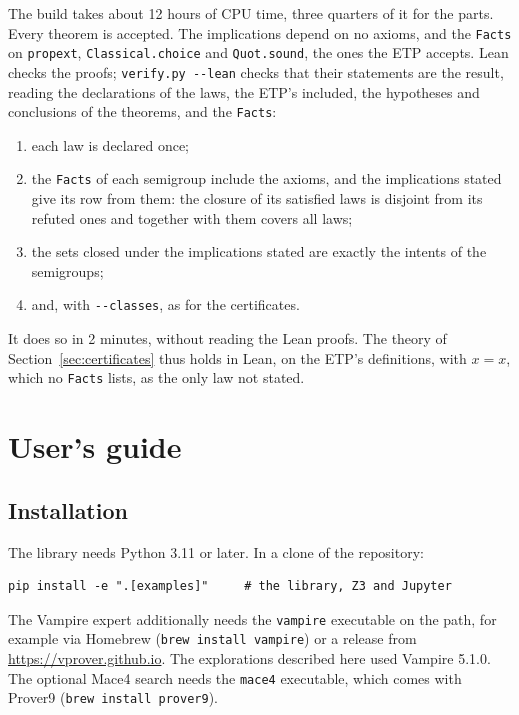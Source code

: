 \documentclass[11pt,a4paper]{article}
\theoremstyle{definition}
\theoremstyle{remark}
\newcommand{\code}[1]{\texttt{#1}}
\begin{document}
The build takes about 12 hours of CPU time, three quarters of it for the parts. Every theorem is accepted. The implications depend on no axioms, and the \code{Facts} on \code{propext}, \code{Classical.choice} and \code{Quot.sound}, the ones the ETP accepts. Lean checks the proofs; \code{verify.py -{}-lean} checks that their statements are the result, reading the declarations of the laws, the ETP's included, the hypotheses and conclusions of the theorems, and the \code{Facts}:
\begin{enumerate}
  \item each law is declared once;
  \item the \code{Facts} of each semigroup include the axioms, and the implications stated give its row from them: the closure of its satisfied laws is disjoint from its refuted ones and together with them covers all laws;
  \item the sets closed under the implications stated are exactly the intents of the semigroups;
  \item and, with \code{-{}-classes}, as for the certificates.
\end{enumerate}
It does so in 2 minutes, without reading the Lean proofs. The theory of Section~\ref{sec:certificates} thus holds in Lean, on the ETP's definitions, with $x = x$, which no \code{Facts} lists, as the only law not stated.

\section{User's guide}\label{sec:guide}

\subsection{Installation}

The library needs Python 3.11 or later. In a clone of the repository:
\begin{Verbatim}
pip install -e ".[examples]"     # the library, Z3 and Jupyter
\end{Verbatim}
The Vampire expert additionally needs the \code{vampire} executable on the path, for example via Homebrew (\code{brew install vampire}) or a release from \url{https://vprover.github.io}. The explorations described here used Vampire 5.1.0. The optional Mace4 search needs the \code{mace4} executable, which comes with Prover9 (\code{brew install prover9}).
\end{document}
